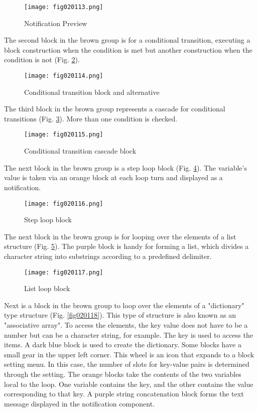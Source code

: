 \begin{figure}[H]
   \centering
   \texttt{[image: fig020113.png]}
   \caption{Notification Preview}
\label{fig020113}
\end{figure}

The second block in the brown group is for a conditional transition, executing a block construction when the condition is met but another construction when the condition is not (Fig. \ref{fig020114}).

\begin{figure}[H]
   \centering
   \texttt{[image: fig020114.png]}
   \caption{Conditional transition block and alternative}
\label{fig020114}
\end{figure}

The third block in the brown group represents a cascade for conditional transitions (Fig. \ref{fig020115}). More than one condition is checked.

\begin{figure}[H]
   \centering
   \texttt{[image: fig020115.png]}
   \caption{Conditional transition cascade block}
\label{fig020115}
\end{figure}

The next block in the brown group is a step loop block (Fig. \ref{fig020116}). The variable's value is taken via an orange block at each loop turn and displayed as a notification.

\begin{figure}[H]
   \centering
   \texttt{[image: fig020116.png]}
   \caption{Step loop block}
\label{fig020116}
\end{figure}

The next block in the brown group is for looping over the elements of a list structure (Fig. \ref{fig020117}). The purple block is handy for forming a list, which divides a character string into substrings according to a predefined delimiter.

\begin{figure}[H]
   \centering
   \texttt{[image: fig020117.png]}
   \caption{List loop block}
\label{fig020117}
\end{figure}

Next is a block in the brown group to loop over the elements of a "dictionary" type structure (Fig. \ref{fig020118}). This type of structure is also known as an "associative array". To access the elements, the key value does not have to be a number but can be a character string, for example. The key is used to access the items. A dark blue block is used to create the dictionary. Some blocks have a small gear in the upper left corner. This wheel is an icon that expands to a block setting menu. In this case, the number of slots for key-value pairs is determined through the setting. The orange blocks take the contents of the two variables local to the loop. One variable contains the key, and the other contains the value corresponding to that key. A purple string concatenation block forms the text message displayed in the notification component.

